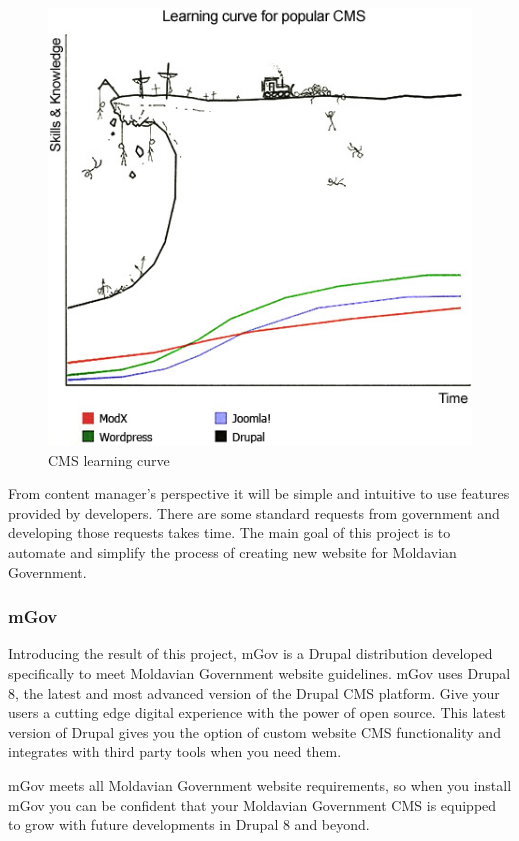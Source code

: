 \begin{figure}[H]
\centering
\includegraphics[width=14cm]{Chapter1/cms_learning_curve.jpg}
\caption{CMS learning curve}
\label{fig:cms_learning_curve}
\end{figure}

From content manager’s perspective it will be simple and intuitive to use features provided by developers. There are some standard requests from government and developing those requests takes time. The main goal of this project is to automate and simplify the process of creating new website for Moldavian Government.

\subsubsection{mGov}
Introducing the result of this project, mGov is a Drupal distribution developed specifically to meet Moldavian Government website guidelines. mGov uses Drupal 8, the latest and most advanced version of the Drupal CMS platform. Give your users a cutting edge digital experience with the power of open source. This latest version of Drupal gives you the option of custom website CMS functionality and integrates with third party tools when you need them. 

mGov meets all Moldavian Government website requirements, so when you install mGov you can be confident that your Moldavian Government CMS is equipped to grow with future developments in Drupal 8 and beyond.

